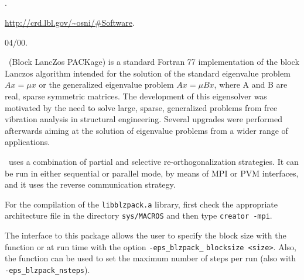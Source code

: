 \subsection*{\underline{\blzpack}}
	\begin{description}
	\setlength{\itemsep}{0pt}
	\item[References.]\citep{Marques:1995:BDU}.
	\item[Website.] \url{http://crd.lbl.gov/\~osni/\#Software}.
	\item[Version.] 04/00.
	\item[Summary.] \blzpack\ (Block LancZos PACKage) is a standard Fortran 77 implementation of the block Lanczos algorithm intended for the solution of the standard eigenvalue problem $Ax=\mu x$ or the generalized eigenvalue problem $Ax=\mu Bx$, where A and B are real, sparse symmetric matrices. The development of this eigensolver was motivated by the need to solve large, sparse, generalized problems from free vibration analysis in structural engineering. Several upgrades were performed afterwards aiming at the solution of eigenvalue problems from a wider range of applications.

	\blzpack\ uses a combination of partial and selective re-orthogonalization strategies. It can be run in either sequential or parallel mode, by means of MPI or PVM interfaces, and it uses the reverse communication strategy.
	\item[Installation.] For the compilation of the \texttt{libblzpack.a} library, first check the appropriate architecture file in the directory \texttt{sys/MACROS} and then type \texttt{creator -mpi}.
	\item[Specific options.] The \slepc interface to this package allows the user to specify the block size with the function  or at run time with the option \Verb!-eps_blzpack_! \Verb!blocksize <size>!. Also, the function  can be used to set the maximum number of steps per run (also with \Verb!-eps_blzpack_nsteps!).
	\end{description}

